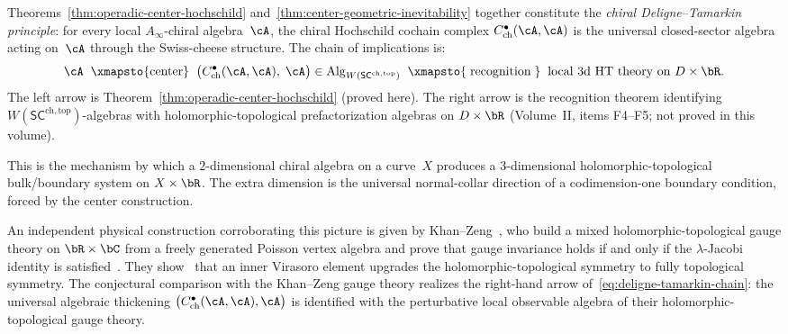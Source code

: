 \begin{remark}
\label{rem:chiral-deligne-tamarkin-dimensional-jump}
Theorems~\ref{thm:operadic-center-hochschild}
and~\ref{thm:center-geometric-inevitability} together constitute
the \emph{chiral Deligne--Tamarkin principle}: for every local
$A_\infty$-chiral algebra~$\cA$, the chiral Hochschild cochain
complex $C^\bullet_{\mathrm{ch}}(\cA,\cA)$ is the universal
closed-sector algebra acting on~$\cA$ through the Swiss-cheese
structure. The chain of implications is:
\begin{equation}\label{eq:deligne-tamarkin-chain}
\cA
\;\;\xmapsto{\text{center}}\;\;
\bigl(C^\bullet_{\mathrm{ch}}(\cA,\cA),\;\cA\bigr)
\in \mathrm{Alg}_{W(\mathsf{SC}^{\mathrm{ch,top}})}
\;\;\xmapsto{\;\text{recognition}\;}\;\;
\text{local 3d HT theory on } D \times \bR.
\end{equation}
The left arrow is Theorem~\ref{thm:operadic-center-hochschild}
(proved here).
The right arrow is the recognition theorem identifying
$W(\mathsf{SC}^{\mathrm{ch,top}})$-algebras with
holomorphic-topological prefactorization algebras on
$D \times \bR$ (Volume~II, items F4--F5; not proved
in this volume).

This is the mechanism by which a $2$-dimensional chiral
algebra on a curve~$X$ produces a $3$-dimensional
holomorphic-topological bulk/boundary system on $X \times \bR$.
The extra dimension is the
universal normal-collar direction of a codimension-one boundary
condition, forced by the center construction.

An independent physical construction corroborating this picture
is given by Khan--Zeng~\cite{KhanZeng25}, who
build a mixed holomorphic-topological gauge theory on
$\bR \times \bC$ from a freely generated Poisson vertex algebra
and prove that gauge invariance holds if and only if the
$\lambda$-Jacobi identity is satisfied~\cite[\S\,2.2]{KhanZeng25}.
They show~\cite[\S\,4.3]{KhanZeng25} that
an inner Virasoro element upgrades the
holomorphic-topological symmetry to fully topological symmetry.
The conjectural comparison with the Khan--Zeng gauge theory realizes
the right-hand arrow of~\eqref{eq:deligne-tamarkin-chain}: the
universal algebraic thickening
$\bigl(C^\bullet_{\mathrm{ch}}(\cA,\cA),\cA\bigr)$ is identified with
the perturbative local observable algebra of their
holomorphic-topological gauge theory.
\end{remark}

